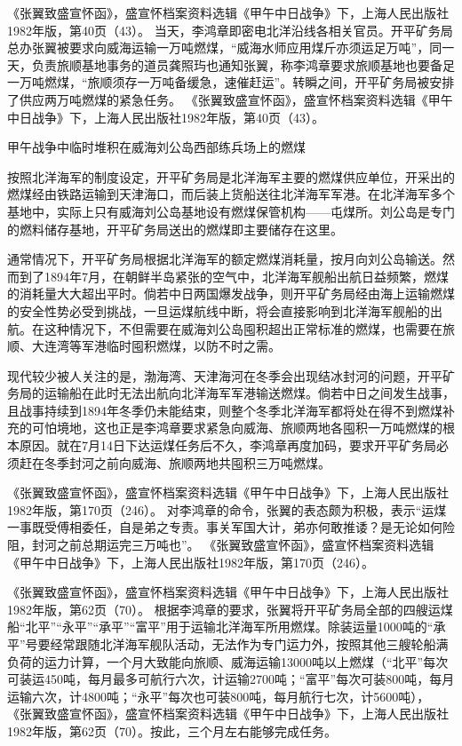 \documentclass[12pt,UTF8]{ctexbook}
\begin{document}
《张翼致盛宣怀函》，盛宣怀档案资料选辑《甲午中日战争》下，上海人民出版社1982年版，第40页（43）。
当天，李鸿章即密电北洋沿线各相关官员。开平矿务局总办张翼被要求向威海运输一万吨燃煤，“威海水师应用煤斤亦须运足万吨”，同一天，负责旅顺基地事务的道员龚照玙也通知张翼，称李鸿章要求旅顺基地也要备足一万吨燃煤，“旅顺须存一万吨备缓急，速催赶运”。转瞬之间，开平矿务局被安排了供应两万吨燃煤的紧急任务。 《张翼致盛宣怀函》，盛宣怀档案资料选辑《甲午中日战争》下，上海人民出版社1982年版，第40页（43）。


甲午战争中临时堆积在威海刘公岛西部练兵场上的燃煤

按照北洋海军的制度设定，开平矿务局是北洋海军主要的燃煤供应单位，开采出的燃煤经由铁路运输到天津海口，而后装上货船送往北洋海军军港。在北洋海军多个基地中，实际上只有威海刘公岛基地设有燃煤保管机构——屯煤所。刘公岛是专门的燃料储存基地，开平矿务局送出的燃煤即主要储存在这里。

通常情况下，开平矿务局根据北洋海军的额定燃煤消耗量，按月向刘公岛输送。然而到了1894年7月，在朝鲜半岛紧张的空气中，北洋海军舰船出航日益频繁，燃煤的消耗量大大超出平时。倘若中日两国爆发战争，则开平矿务局经由海上运输燃煤的安全性势必受到挑战，一旦运煤航线中断，将会直接影响到北洋海军舰船的出航。在这种情况下，不但需要在威海刘公岛囤积超出正常标准的燃煤，也需要在旅顺、大连湾等军港临时囤积燃煤，以防不时之需。

现代较少被人关注的是，渤海湾、天津海河在冬季会出现结冰封河的问题，开平矿务局的运输船在此时无法出航向北洋海军军港输送燃煤。倘若中日之间发生战事，且战事持续到1894年冬季仍未能结束，则整个冬季北洋海军都将处在得不到燃煤补充的可怕境地，这也正是李鸿章要求紧急向威海、旅顺两地各囤积一万吨燃煤的根本原因。就在7月14日下达运煤任务后不久，李鸿章再度加码，要求开平矿务局必须赶在冬季封河之前向威海、旅顺两地共囤积三万吨燃煤。

《张翼致盛宣怀函》，盛宣怀档案资料选辑《甲午中日战争》下，上海人民出版社1982年版，第170页（246）。
对李鸿章的命令，张翼的表态颇为积极，表示“运煤一事既受傅相委任，自是弟之专责。事关军国大计，弟亦何敢推诿？是无论如何险阻，封河之前总期运完三万吨也”。 《张翼致盛宣怀函》，盛宣怀档案资料选辑《甲午中日战争》下，上海人民出版社1982年版，第170页（246）。

《张翼致盛宣怀函》，盛宣怀档案资料选辑《甲午中日战争》下，上海人民出版社1982年版，第62页（70）。
根据李鸿章的要求，张翼将开平矿务局全部的四艘运煤船“北平”“永平”“承平”“富平”用于运输北洋海军所用燃煤。除装运量1000吨的“承平”号要经常跟随北洋海军舰队活动，无法作为专门运力外，按照其他三艘轮船满负荷的运力计算，一个月大致能向旅顺、威海运输13000吨以上燃煤（“北平”每次可装运450吨，每月最多可航行六次，计运输2700吨；“富平”每次可装800吨，每月运输六次，计4800吨；“永平”每次也可装800吨，每月航行七次，计5600吨）， 《张翼致盛宣怀函》，盛宣怀档案资料选辑《甲午中日战争》下，上海人民出版社1982年版，第62页（70）。按此，三个月左右能够完成任务。
\end{document}
